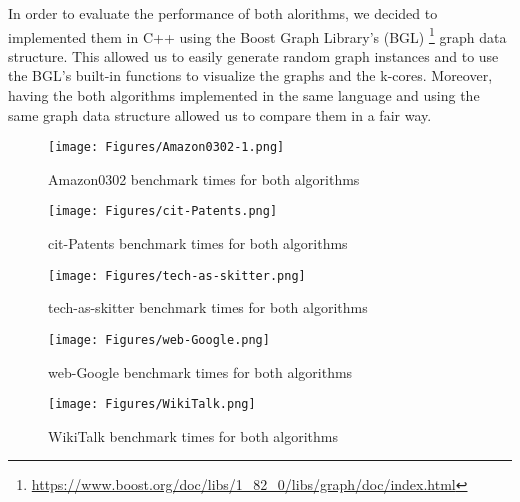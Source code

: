 \label{Evaluation}

In order to evaluate the performance of both alorithms, we decided to implemented them in C++ using the Boost Graph Library's (BGL) \footnote{\url{https://www.boost.org/doc/libs/1_82_0/libs/graph/doc/index.html}} graph data structure. This allowed us to easily generate random graph instances and to use the BGL's built-in functions to visualize the graphs and the k-cores. Moreover, having the both algorithms implemented in the same language and using the same graph data structure allowed us to compare them in a fair way.

\begin{figure}[htb]
    \centering
    \texttt{[image: Figures/Amazon0302-1.png]}
    \caption{Amazon0302 benchmark times for both algorithms}
    \label{fig:amazon}
\end{figure}

\begin{figure}[htb]
    \centering
    \texttt{[image: Figures/cit-Patents.png]}
    \caption{cit-Patents benchmark times for both algorithms}
    \label{fig:cit-patents}
\end{figure}

\begin{figure}[htb]
    \centering
    \texttt{[image: Figures/tech-as-skitter.png]}
    \caption{tech-as-skitter benchmark times for both algorithms}
    \label{fig:tech-as-skitter}
\end{figure}

\begin{figure}[htb]
    \centering
    \texttt{[image: Figures/web-Google.png]}
    \caption{web-Google benchmark times for both algorithms}
    \label{fig:amazon}
\end{figure}

\begin{figure}[htb]
    \centering
    \texttt{[image: Figures/WikiTalk.png]}
    \caption{WikiTalk benchmark times for both algorithms}
    \label{fig:wikitalk}
\end{figure}